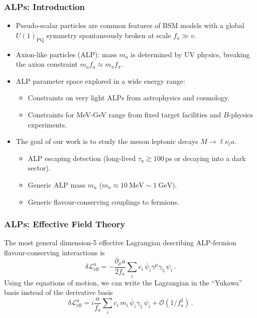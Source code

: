 \documentclass[mathserif, 10pt]{beamer}
\begin{document}
\begin{frame}\frametitle{ALPs: Introduction}
    \begin{itemize}
        \item Pseudo-scalar particles are common features of BSM models with a global $U(1)_\mathrm{PQ}$ symmetry spontaneously broken at scale $f_a \gg v$.
        \item Axion-like particles (ALP): mass $m_a$ is determined by UV physics, breaking the axion constraint $m_a f_a \approx m_\pi f_\pi$.
        \item ALP parameter space explored in a wide energy range:
              \begin{itemize}
                  \item Constraints on very light ALPs from astrophysics and cosmology.
                  \item Constraints for MeV-GeV range from fixed target facilities and $B$-physics experiments.
              \end{itemize}
        \item The goal of our work is to study the meson leptonic decays $M\to \ell \nu_\ell a$.
              \begin{itemize}
                  \item ALP escaping detection (long-lived $\tau_a \gtrsim 100\,\mathrm{ps} $ or decaying into a dark sector).
                  \item Generic ALP mass $m_a$ ($m_a \approx 10\ \mathrm{MeV}\sim 1\ \mathrm{GeV}$).
                  \item Generic flavour-conserving couplings to fermions.
              \end{itemize}
    \end{itemize}
\end{frame}

\begin{frame}\frametitle{ALPs: Effective Field Theory}
    The most general dimension-5 effective Lagrangian describing ALP-fermion flavour-conserving interactions is
    $$ \delta \mathcal{L}^{a}_{\mathrm{eff}} =
        -\frac{\partial_\mu a}{ 2 f_a} \sum_{i} c_i \,\overline{\psi}_i \gamma^\mu \gamma_5 \,\psi_i\,. $$
    Using the equations of motion, we can write the Lagrangian in the ``Yukawa'' basis instead of the derivative basis
    $$\delta \mathcal{L}^{a}_{\mathrm{eff}} = i \frac{a}{f_a} \sum_{i}  c_i\, m_i \, \overline{\psi}_i \gamma_5 \,\psi_i + \mathcal{O}(1/f_a^2) \,.$$
\end{frame}
\end{document}
